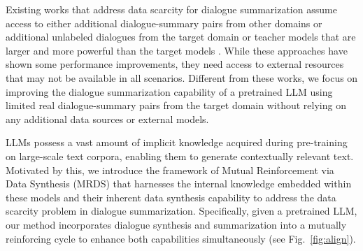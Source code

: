 Existing works that address data scarcity for dialogue summarization assume access to either additional dialogue-summary pairs from other domains \citep{li-etal-2023-dionysus,park2024gendex,yu-etal-2021-adaptsum,zou-etal-2021-low, zhong2022dialoglm} or additional unlabeled dialogues from the target domain \citep{chen2021simple,he-etal-2024-semi} or 
teacher models that are larger and more powerful than the target models \citep{ouyang2023compositional,pham-etal-2023-select}. While these approaches have shown some performance improvements, they need access to external resources that may not be available in all scenarios. Different from these works, we focus on improving the dialogue summarization capability of a pretrained LLM using limited real dialogue-summary pairs from the target domain without relying on any additional data sources or external models.


LLMs possess a vast amount of implicit knowledge acquired during pre-training on large-scale text corpora, enabling them to generate contextually relevant text. 
Motivated by this, we introduce the framework of Mutual Reinforcement via Data Synthesis (MRDS) that harnesses the internal knowledge embedded within these models and their inherent data synthesis capability to address the data scarcity problem in dialogue summarization. Specifically, given a pretrained LLM, our method incorporates dialogue synthesis and summarization into a mutually reinforcing cycle to enhance both capabilities simultaneously (see Fig.~\ref{fig:align}). 

